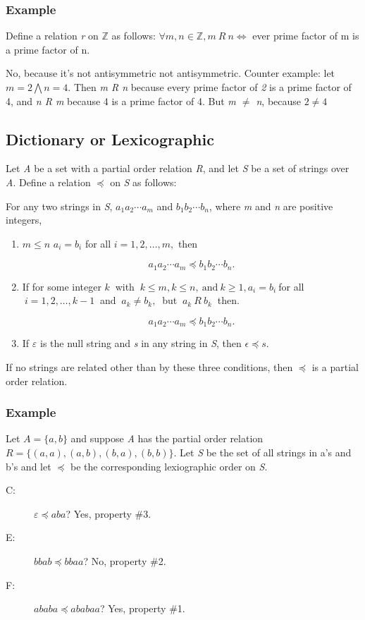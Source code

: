 \documentclass[12pt]{article}
\begin{document}
\subsubsection{Example}
Define a relation \textit{r} on $ \mathbb{Z} $ as follows: $ \forall m, n \in \mathbb{Z}, m \ R \ n \Leftrightarrow$ ever prime factor of m is a prime factor of n.

No, because it's not antisymmetric not antisymmetric. Counter example: let $m = 2 \bigwedge n = 4$. Then \textit{m R n} because every prime factor of \textit{2} is a prime factor of 4, and \textit{n R m} because 4 is a prime factor of 4. But \textit{m $\neq$ n}, because $2 \neq 4$

\subsection{Dictionary or Lexicographic}
Let \textit{A} be a set with a partial order relation \textit{R}, and let \textit{S} be a set of strings over \textit{A}. Define a relation $\preceq$ on \textit{S} as follows:

For any two strings in \textit{S}, $a_1a_2 \cdots a_m$ and $b_1b_2 \cdots b_n$, where \textit{m} and \textit{n} are positive integers,

\begin{enumerate}
\item $m \leq n$ $a_i = b_i$ for all $i = 1, 2, \ldots, m,$ then

\begin{equation*}
a_1a_2 \cdots a_m \preceq b_1b_2 \cdots b_n.
\end{equation*}

\item If for some integer $k \ $ with $\ k \leq m, k \leq n, \ \text{and} \ k \geq 1, a_i = b_i \ $for all$ \ i = 1, 2, \ldots, k - 1 \ $ and $\ a_k \neq b_k, \ $ but $\ a_k \ R \ b_k \ $ then.

\begin{equation*}
a_1a_2 \cdots a_m \preceq b_1b_2 \cdots b_n.
\end{equation*}

\item If $\varepsilon$ is the null string and \textit{s} in any string in \textit{S}, then $\epsilon \preceq s$.
\end{enumerate}

If no strings are related other than by these three conditions, then $\preceq$ is a partial order relation.

\subsubsection{Example}
Let $A = \{ a,b \}$ and suppose \textit{A} has the partial order relation $R = \{ (a, a), (a, b), (b, a), (b, b) \}.$ Let \textit{S} be the set of all strings in a's and b's and let $\preceq$ be the corresponding lexiographic order on \textit{S}.

\begin{description}
\item [C: ] $\varepsilon \preceq aba$? Yes, property \#3.
\item [E: ] $bbab \preceq bbaa$? No, property \#2.
\item [F: ] $ababa \preceq ababaa$? Yes, property \#1.
\end{description}
\end{document}
